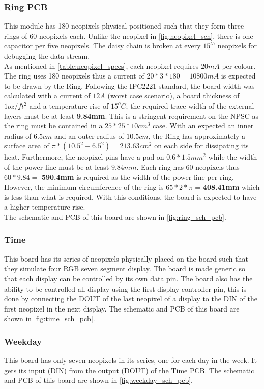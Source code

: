 \subsubsection{Ring PCB}\label{ring_pcb}
This module has 180 neopixels physical positioned such that they form three rings of 60 neopixels each. Unlike the neopixel in \cref{fig:neopixel_sch}, there is one capacitor per five neopixels. The daisy chain is broken at every $15^{th}$ neopixels for debugging the data stream. \\
As mentioned in \cref{table:neopixel_specs}, each neopixel requires $20mA$ per colour. The ring uses 180 neopixels thus a current of $20*3*180 = 10800 mA$ is expected to be drawn by the Ring. Following the IPC2221 standard, the board width was calculated with a current of $12A$ (worst case scenario), a board thickness of $1oz/ft^2$ and a temperature rise of $15^oC$; the required trace width of the external layers must be at least \textbf{9.84mm}. This is a stringent requirement on the NPSC as the ring must be contained in a $25*25*10cm^3$ case. With an expected an inner radius of $6.5cm$ and an outer radius of $10.5cm$, the Ring has approximately a surface area of $ \pi*(10.5^2-6.5^2) = 213.63 cm^2$ on each side for dissipating its heat. Furthermore, the neopixel pins have a pad on $0.6*1.5 mm^2$ while the width of the power line must be at least $9.84mm$. Each ring has 60 neopixels thus $60*9.84=$ \textbf{590.4mm} is required as the width of the power line per ring. However, the minimum circumference of the ring is $65*2*\pi$ = \textbf{408.41mm} which is less than what is required. With this conditions, the board is expected to have a higher temperature rise.\\
The schematic and PCB of this board are shown in \cref{fig:ring_sch_pcb}.

\subsubsection{Time}
This board has its series of neopixels physically placed on the board such that they simulate four RGB seven segment display. The board is made generic so that each display can be controlled by its own data pin. The board also has the ability to be controlled all display using the first display controller pin, this is done by connecting the DOUT of the last neopixel of a display to the DIN of the first neopixel in the next display.
The schematic and PCB of this board are shown in \cref{fig:time_sch_pcb}.

\subsubsection{Weekday}
This board has only seven neopixels in its series, one for each day in the week. It gets its input (DIN) from the output (DOUT) of the Time PCB.
The schematic and PCB of this board are shown in \cref{fig:weekday_sch_pcb}.

